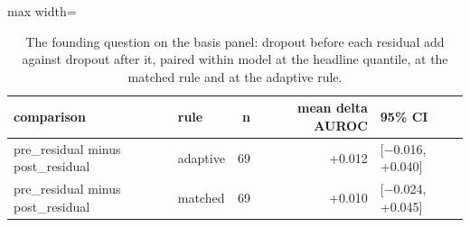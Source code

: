 \begin{table}[htbp]
\centering
\small
\caption{The founding question on the basis panel: dropout before each residual add against dropout after it, paired within model at the headline quantile, at the matched rule and at the adaptive rule.}
\label{tab:pre-post}
\begin{adjustbox}{max width=\linewidth}
\begin{tabular}{llrrl}
\toprule
comparison & rule & n & mean delta AUROC & 95\% CI \\
\midrule
pre\_residual minus post\_residual & adaptive & 69 & +0.012 & [$-$0.016, +0.040] \\
pre\_residual minus post\_residual & matched & 69 & +0.010 & [$-$0.024, +0.045] \\
\bottomrule
\end{tabular}
\end{adjustbox}
\end{table}
